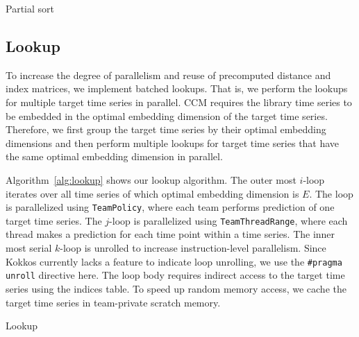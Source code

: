 \documentclass{acmart}
\begin{document}
\begin{algorithm}
    \SetAlgoLined
    \DontPrintSemicolon
    \caption{Partial sort}%
    \label{alg:partial-sort}
\end{algorithm}

\subsection{Lookup}

To increase the degree of parallelism and reuse of precomputed distance and
index matrices, we implement batched lookups. That is, we perform the lookups
for multiple target time series in parallel. CCM requires the library
time series to be embedded in the optimal embedding dimension of the target
time series. Therefore, we first group the target time series by their optimal
embedding dimensions and then perform multiple lookups for target time series that
have the same optimal embedding dimension in parallel.

Algorithm~\ref{alg:lookup} shows our lookup algorithm. The outer most $i$-loop
iterates over all time series of which optimal embedding dimension is $E$. The loop is
parallelized using \texttt{TeamPolicy}, where each team performs prediction of one
target time series. The $j$-loop is parallelized using \texttt{TeamThreadRange},
where each thread makes a prediction for each time point within a time series. The
inner most serial $k$-loop is unrolled to increase instruction-level parallelism. Since Kokkos currently
lacks a feature to indicate loop unrolling, we use the \texttt{\#pragma
unroll} directive here. The loop body requires indirect access to the target
time series using the indices table. To speed up random memory access, we cache the
target time series in team-private scratch memory.

\begin{algorithm}
    \SetAlgoLined
    \DontPrintSemicolon
    \caption{Lookup}%
    \label{alg:lookup}
\end{algorithm}
\end{document}
